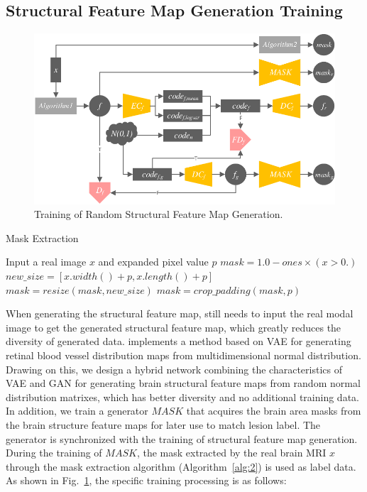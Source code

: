 \documentclass[letterpaper]{article} %
\begin{document}
\subsection{Structural Feature Map Generation Training}
\begin{figure}
	\centering
	\includegraphics[width=0.98\columnwidth]{figures/feature_train}
	\caption{Training of Random Structural Feature Map Generation.}
	\label{feature_train}
\end{figure}
\begin{algorithm}
	\caption{Mask Extraction}
	\label{alg:2}
	\begin{algorithmic}[1]
		\State Input a real image $x$ and expanded pixel value $p$
		\State $mask = 1.0 - ones \times (x > 0.)$
		\State $new\_size=[x.width() + p, x.length() + p]$
		\State $mask = resize(mask, new\_size)$
		\State $mask = crop\_padding(mask,p)$
	\end{algorithmic}  
\end{algorithm}
When generating the structural feature map, \cite{4shin2018medical} still needs to input the real modal image to get the generated structural feature map, which greatly reduces the diversity of generated data. \cite{41costa2017towards} implements a method based on VAE for generating retinal blood vessel distribution maps from multidimensional normal distribution. Drawing on this, we design a hybrid network combining the characteristics of VAE and GAN for generating brain structural feature maps from random normal distribution matrixes, which has better diversity and no additional training data. In addition,  we train a generator $MASK$ that acquires the brain area masks from the brain structure feature maps for later use to match lesion label. The generator is synchronized with the training of structural feature map generation. During the training of $MASK$, the mask extracted by the real brain MRI $x$ through the mask extraction algorithm (Algorithm~\ref{alg:2}) is used as label data. As shown in Fig.~\ref{feature_train}, the specific training processing is as follows:
\end{document}
